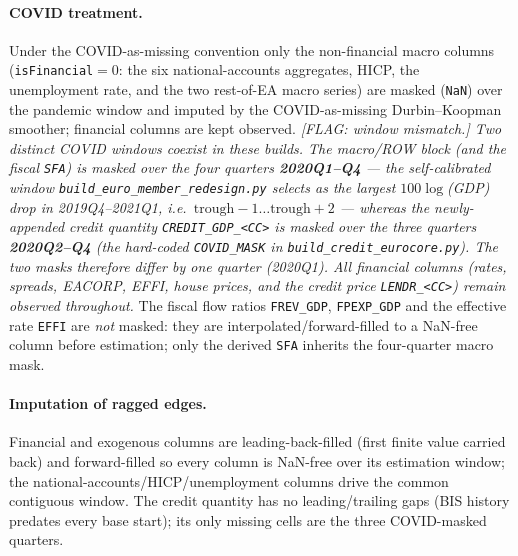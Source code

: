 \paragraph{COVID treatment.}
\label{sec:data:eurocore:covid}
Under the COVID-as-missing convention only the non-financial macro columns
(\texttt{isFinancial}$=0$: the six national-accounts aggregates, HICP, the
unemployment rate, and the two rest-of-EA macro series) are masked
(\texttt{NaN}) over the pandemic window and imputed by the
COVID-as-missing Durbin--Koopman smoother; financial columns are kept
observed. \textit{[FLAG: window mismatch.] Two distinct COVID windows coexist
in these builds. The macro/ROW block (and the fiscal \texttt{SFA}) is masked
over the \emph{four} quarters \textbf{2020Q1--Q4} — the self-calibrated window
\texttt{build\_euro\_member\_redesign.py} selects as the largest
$100\log$(GDP) drop in 2019Q4--2021Q1, i.e.\ $\text{trough}-1\ldots\text{trough}+2$
— whereas the newly-appended credit quantity \texttt{CREDIT\_GDP\_<CC>} is
masked over the \emph{three} quarters \textbf{2020Q2--Q4} (the hard-coded
\texttt{COVID\_MASK} in \texttt{build\_credit\_eurocore.py}). The two masks
therefore differ by one quarter (2020Q1). All financial columns
(rates, spreads, EACORP, EFFI, house prices, and the credit price
\texttt{LENDR\_<CC>}) remain observed throughout.}
The fiscal flow ratios \texttt{FREV\_GDP}, \texttt{FPEXP\_GDP} and the effective
rate \texttt{EFFI} are \emph{not} masked: they are interpolated/forward-filled
to a NaN-free column before estimation; only the derived \texttt{SFA} inherits
the four-quarter macro mask.

\paragraph{Imputation of ragged edges.}
Financial and exogenous columns are leading-back-filled (first finite value
carried back) and forward-filled so every column is NaN-free over its
estimation window; the national-accounts/HICP/unemployment columns drive the
common contiguous window. The credit quantity has no leading/trailing gaps
(BIS history predates every base start); its only missing cells are the three
COVID-masked quarters.

